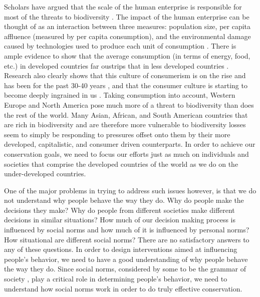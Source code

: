 \documentclass[rutwik_proposal.tex]{subfiles}
\begin{document}
Scholars have argued that the scale of the human enterprise is responsible for most of the threats to biodiversity \cite{Ehrlich94}. The impact of the human enterprise can be thought of as an interaction between three measures: population size, per capita affluence (measured by per capita consumption), and the environmental damage caused by technologies used to produce each unit of consumption \cite{Ehrlich71}. There is ample evidence to show that the average consumption (in terms of energy, food, etc.) in developed countries far oustrips that in less developed countries \cite{UScons08, Lenzen99}. Research also clearly shows that this culture of consumerism is on the rise and has been for the past 30-40 years \cite{Schor99}, and that the consumer culture is starting to become deeply ingrained in us \cite{Schor04}. Taking consumption into account, Western Europe and North America pose much more of a threat to biodiversity than does the rest of the world. Many Asian, African, and South American countries that are rich in biodiversity and are therefore more vulnerable to biodiversity losses seem to simply be responding to pressures offset onto them by their more developed, capitalistic, and consumer driven counterparts. In order to achieve our conservation goals, we need to focus our efforts just as much on individuals and societies that comprise the developed countries of the world as we do on the under-developed countries.

One of the major problems in trying to address such issues however, is that we do not understand why people behave the way they do. Why do people make the decisions they make? Why do people from different societies make different decisions in similar situations? How much of our decision making process is influenced by social norms and how much of it is influenced by personal norms? How situational are different social norms? There are no satisfactory answers to any of these questions. In order to design interventions aimed at influencing people's behavior, we need to have a good understanding of why people behave the way they do. Since social norms, considered by some to be the grammar of society \cite{Bicchieri05}, play a critical role in determining people's behavior, we need to understand how social norms work in order to do truly effective conservation.
\end{document}
